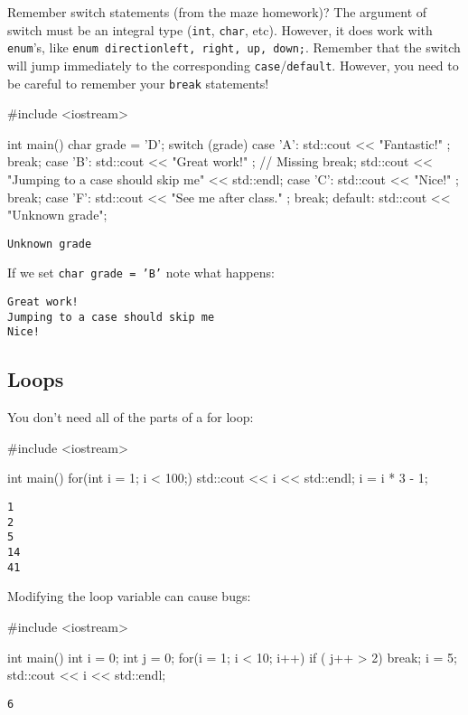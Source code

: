 \documentclass[12pt,letterpaper,twoside]{article}
\begin{document}
Remember switch statements (from the maze homework)? The argument of switch must be an integral type (\texttt{int}, \texttt{char}, etc).  However, it does work with \texttt{enum}'s, like \texttt{enum direction{left, right, up, down};}.  Remember that the switch will jump immediately to the corresponding \texttt{case}/\texttt{default}.  However, you need to be careful to remember your \texttt{break} statements!

\begin{cpp}
#include <iostream>

int main() {
  char grade = 'D';
  switch (grade) {
    case 'A': std::cout << "Fantastic!\n"          ; break;
    case 'B': std::cout << "Great work!\n"         ; // Missing break;
    std::cout << "Jumping to a case should skip me" << std::endl;
    case 'C': std::cout << "Nice!\n"               ; break;
    case 'F': std::cout << "See me after class.\n" ; break;
    default: std::cout << "Unknown grade\n"; 
  }
}
\end{cpp}
\vspace{-3ex}
{\footnotesize
\begin{verbatim}
Unknown grade
\end{verbatim}}

If we set \texttt{char grade = 'B'} note what happens:
{\footnotesize
\begin{verbatim}
Great work!
Jumping to a case should skip me
Nice!
\end{verbatim}}



\subsection{Loops}

You don't need all of the parts of a for loop:
\begin{cpp}
#include <iostream>

int main() {
  for(int i = 1; i < 100;){
    std::cout << i << std::endl;
    i = i * 3 - 1;
  }
}
\end{cpp}
\vspace{-3ex}
{\footnotesize
\begin{verbatim}
1  
2  
5  
14 
41 
\end{verbatim}}
\newpage
Modifying the loop variable can cause bugs:
\begin{cpp}
#include <iostream>

int main() {
  int i = 0;
  int j = 0;
  for(i = 1; i < 10; i++){
    if ( j++ > 2) break;
    i = 5;
  }
  std::cout << i << std::endl; 
}
\end{cpp}
\vspace{-3ex}
{\footnotesize
\begin{verbatim}
6
\end{verbatim}}
\end{document}

